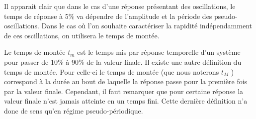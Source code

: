 Il apparait clair que dans le cas d'une réponse présentant des oscillations,
le temps de réponse à 5\% va dépendre de l'amplitude et la période des 
pseudo-oscillations. Dans le cas où l'on souhaite caractériser la rapidité
indépendamment de ces oscillations, on utilisera le temps de montée.

Le temps de montée $t_m$ est le temps mis par réponse temporelle d'un système 
pour passer de 10\% à 90\% de la valeur finale. Il existe une autre 
définition du temps de montée. Pour celle-ci le temps de montée (que nous 
noterons $t_{M}$ ) correspond à la durée au bout de laquelle la 
réponse passe pour la première fois par la valeur finale. Cependant, 
il faut remarquer que pour certaine réponse la valeur finale n'est 
jamais atteinte en un temps fini. Cette dernière définition
n'a donc de sens qu'en régime pseudo-périodique.

